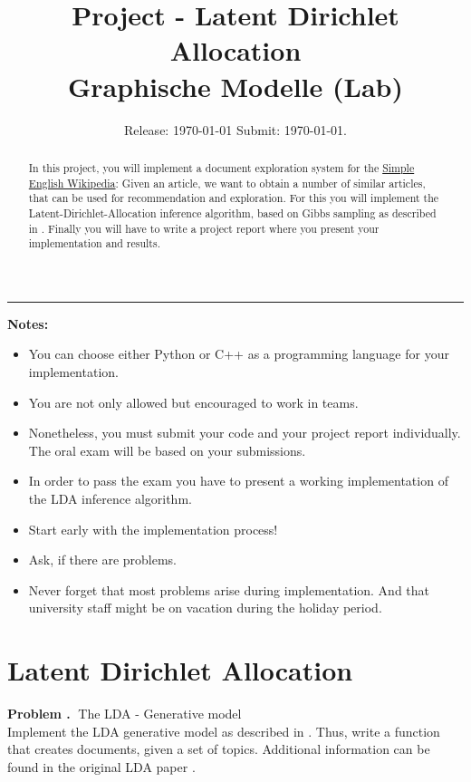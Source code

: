 \documentclass[10pt]{article}
\newcounter{problemCounter}
\newenvironment{problem}[1]
{
	\vspace{0.5cm}
	\refstepcounter{problemCounter}\label{#1}
	\noindent \textbf{Problem \theproblemCounter.$\;$} 
}{}
\begin{document}
 
\title{ Project - Latent Dirichlet Allocation \\
	Graphische Modelle (Lab)}
\author{Release: \today \; Submit: \AdvanceDate[32]\today.\\}
\date{}
\maketitle

\hrule
\begin{abstract}
In this project, you will implement a document exploration system for the \href{https://simple.wikipedia.org/wiki/Main_Page}{Simple English Wikipedia}\cite{url:sew}: Given an article, we want to obtain a number of similar articles, that can be used for recommendation and exploration. For this you will implement the Latent-Dirichlet-Allocation inference algorithm, based on Gibbs sampling as described in \cite{heinrich:pefta}. Finally you will have to write a project report where you present your implementation and results. \\
\end{abstract}
\bigskip
\bigskip
\textbf{Notes:}
\begin{itemize}
	\item You can choose either Python or C++ as a programming language for your implementation.
	\item You are not only allowed but encouraged to work in teams.
	\item Nonetheless, you must submit your code and your project report individually. The oral exam will be based on your submissions.
	\item In order to pass the exam you have to present a working implementation of the LDA inference algorithm.
	\item Start early with the implementation process!
	\item Ask, if there are problems.
	\item Never forget that most problems arise during implementation. And that university staff might be on vacation during the holiday period.
\end{itemize}

\section{Latent Dirichlet Allocation}
\begin{problem}
	TThe LDA - Generative model \\
	Implement the LDA generative model as described in \cite{heinrich:pefta}. Thus, write a function that creates documents, given a set of topics. Additional information can be found in the original LDA paper \cite{blei:lda}.
\end{problem}
\end{document}
